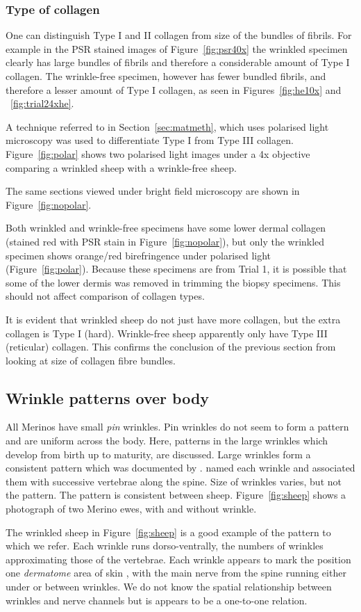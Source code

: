 \documentclass[]{interact}
\theoremstyle{plain}%
\theoremstyle{definition}
\theoremstyle{remark}
\begin{document}
\subsubsection{Type of collagen}

One can distinguish Type  I and II  collagen from size of the bundles of fibrils. For example in  the PSR stained images of Figure~\ref{fig:psr40x} the wrinkled specimen clearly has large bundles of fibrils and therefore a considerable amount of Type I collagen. The wrinkle-free specimen, however has fewer bundled fibrils, and therefore a lesser amount of Type I collagen, as seen in Figures~\ref{fig:he10x} and ~\ref{fig:trial24xhe}.

A  technique referred to in Section~\ref{sec:matmeth}, which uses polarised light microscopy was used  to differentiate Type I from Type III collagen.  
Figure~\ref{fig:polar} shows two polarised light images under a 4x objective comparing a wrinkled sheep with a wrinkle-free sheep.

The same sections viewed under bright field microscopy are shown in Figure~\ref{fig:nopolar}. 


Both wrinkled and wrinkle-free specimens have some lower dermal collagen (stained red with PSR stain in Figure~\ref{fig:nopolar}), but only the wrinkled specimen shows orange/red birefringence under polarised light (Figure~\ref{fig:polar}).  Because these specimens are from Trial 1, it is possible that some of the lower dermis was removed in trimming the biopsy specimens. This should not affect comparison of collagen types.

 It is evident that wrinkled sheep do not just have more collagen, but the extra collagen is Type I (hard). Wrinkle-free sheep apparently only have Type III (reticular) collagen. This confirms the conclusion of the previous section from looking at size of collagen fibre bundles.

\subsection{Wrinkle patterns over body}
\label{sec:pattern}
All Merinos have small {\em pin} wrinkles. Pin wrinkles do not seem to form a pattern and are uniform across the body. Here, patterns in the large wrinkles which develop from birth up to maturity, are discussed. Large wrinkles form a consistent pattern which was documented by \citep{carter-1943}. \citeauthor{carter-1943} named each wrinkle and associated them with successive vertebrae along the spine. Size of wrinkles varies, but not the pattern. The pattern is consistent between sheep.  Figure~\ref{fig:sheep} shows a photograph of two Merino ewes, with and without wrinkle. 

The wrinkled sheep in Figure~\ref{fig:sheep} is a good example of the pattern to which we refer.  Each wrinkle runs dorso-ventrally, the numbers of wrinkles approximating those of the vertebrae. Each wrinkle appears to mark the position one {\em dermatome} area of skin \citep{kirk-1968}, with the main nerve from the spine running either under or between wrinkles. We do not know the spatial relationship between wrinkles and nerve channels but is appears to be a one-to-one relation.
\end{document}
